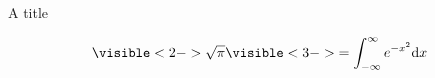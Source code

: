 \documentclass[11pt]{beamer}
\begin{document}
\begin{frame}{A title}
\begin{theorem}
\begin{align*}
\visible<2->{\sqrt{\pi}} \visible<3->{= \int_{-\infty}^\infty e^{-x^2} \text{d} x}
\end{align*}
\end{theorem}
\end{frame}
\end{document}
